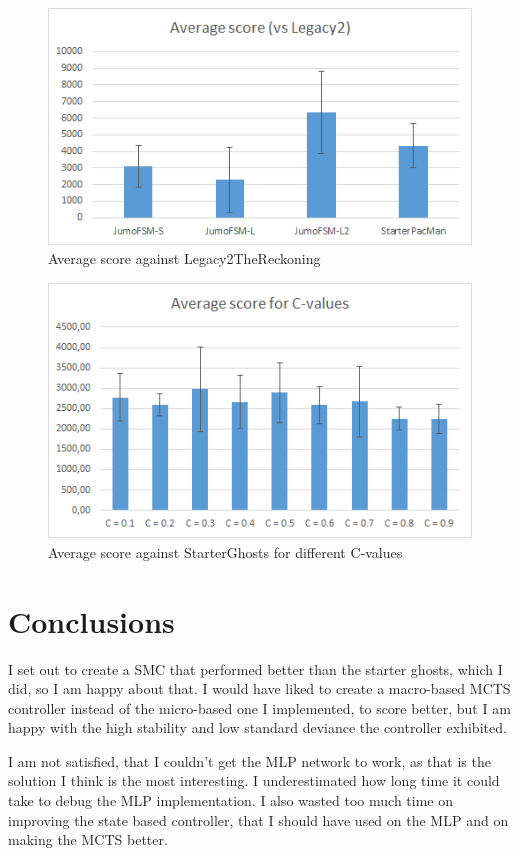 \documentclass[conference]{IEEEtran}
\begin{document}
\begin{figure}[htp]
\centerline{\includegraphics[width=0.9\columnwidth]{average_legacy2.png}}
\caption{Average score against Legacy2TheReckoning}
\label{fig-avgl2}
\end{figure}

\begin{figure}[htp]
\centerline{\includegraphics[width=0.9\columnwidth]{c_values.png}}
\caption{Average score against StarterGhosts for different C-values}
\label{fig-cvals}
\end{figure}

\section{Conclusions}

I set out to create a SMC that performed better than the starter ghosts, which I did, so I am happy about that.
I would have liked to create a macro-based MCTS controller instead of the micro-based one I implemented, to score better, but I am happy with the high stability and low standard deviance the controller exhibited.

I am not satisfied, that I couldn't get the MLP network to work, as that is the solution I think is the most interesting. I underestimated how long time it could take to debug the MLP implementation. I also wasted too much time on improving the state based controller, that I should have used on the MLP and on making the MCTS better.
\end{document}
